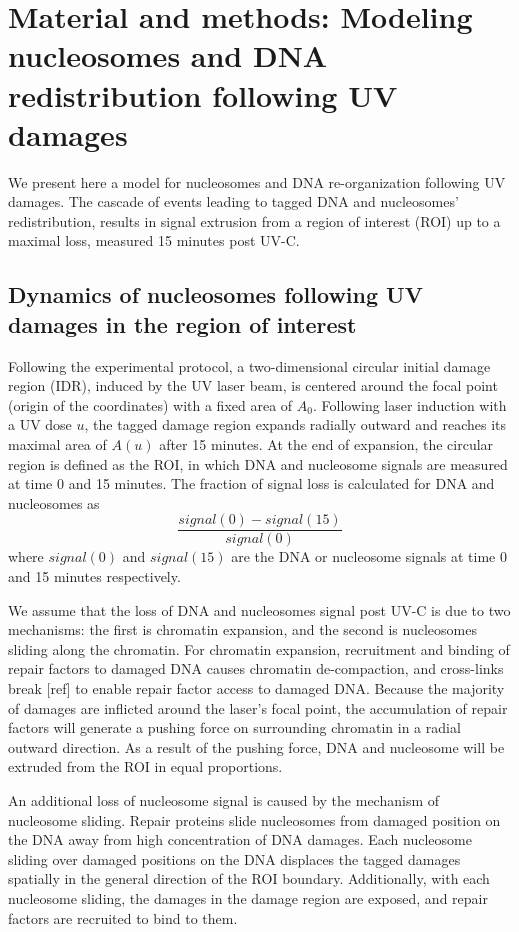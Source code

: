 \documentclass[12pt]{article}
\begin{document}
 \section{Material and methods: Modeling nucleosomes and DNA redistribution following UV damages} 
	
	We present here a model for nucleosomes and DNA re-organization following
	UV damages. The cascade of events leading to tagged DNA and nucleosomes'
	redistribution, results in signal extrusion from a region of interest (ROI) up
	to a maximal loss, measured 15 minutes post UV-C.
	
	\subsection{Dynamics of nucleosomes following UV damages in the region of interest}
	
	Following the experimental protocol, a two-dimensional circular initial damage region (IDR), induced by the UV laser beam, is centered around the focal point (origin of the coordinates) with a fixed area of $A_0$. Following
	laser induction with a UV dose $u$, the tagged damage region expands radially outward and reaches its maximal area of $A(u)$ after 15 minutes. At the end of expansion, the circular region is defined
	as the ROI, in which DNA and nucleosome signals are measured at
	time 0 and 15 minutes. The fraction of signal loss is calculated for DNA and nucleosomes as
	\begin{equation}
	\frac{signal(0)-signal(15)}{signal(0)}
	\end{equation}	
	where $signal(0)$ and $signal(15)$ are the DNA or nucleosome signals at time 0 and 15 minutes respectively. 
	
	We assume that the loss of DNA and nucleosomes signal post UV-C is due
	to two mechanisms: the first is chromatin expansion, and the second is nucleosomes sliding along the chromatin. For chromatin expansion, recruitment and
	binding of repair factors to damaged DNA causes chromatin de-compaction, and cross-links break [ref] to enable repair factor access to damaged DNA. Because the majority of damages are inflicted around the laser's focal point, the accumulation of repair factors will generate a pushing force on surrounding chromatin in a radial outward direction. As a result of the pushing force, DNA and nucleosome will be extruded from the ROI in equal proportions. 
	
	An additional loss of nucleosome signal is caused by the mechanism of nucleosome sliding. Repair proteins slide nucleosomes from damaged position on the DNA away from high concentration of DNA damages. Each nucleosome sliding over damaged positions on the DNA displaces the tagged damages
    spatially in the general direction of the ROI boundary. Additionally, with each nucleosome sliding, the damages in the damage region are exposed, and repair factors are recruited to bind to them.   
\end{document}
